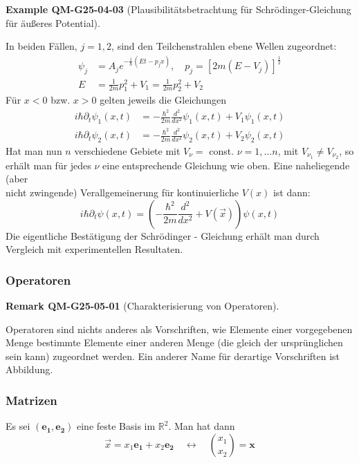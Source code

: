 \documentclass[10pt, letterpaper]{article}
\newcommand{\CustomHeading}[3]{%
  \par\medskip\noindent%
  \textbf{#1 #2} \textnormal{(#3)}.\enskip%
}
\newenvironment{REM}[2]{\begin{unitbox}\CustomHeading{Remark}{#1}{#2}}{\end{unitbox}}
\newenvironment{EXA}[2]{\begin{unitbox}\CustomHeading{Example}{#1}{#2}}{\end{unitbox}}
\begin{document}
\begin{EXA}{QM-G25-04-03}{Plausibilitätsbetrachtung für Schrödinger-Gleichung für äußeres Potential}
In beiden Fällen, $j=1,2$, sind den Teilchenstrahlen ebene Wellen zugeordnet:
$$
\begin{aligned}
\psi_{j} & =A_{j} e^{-\frac{i}{\hbar}\left(E t-p_{j} x\right)}, \quad p_{j}=\left[2 m\left(E-V_{j}\right)\right]^{\frac{1}{2}} \\
E & =\frac{1}{2 m} p_{1}^{2}+V_{1}=\frac{1}{2 m} p_{2}^{2}+V_{2}
\end{aligned}
$$
Für $x<0$ bzw. $x>0$ gelten jeweils die Gleichungen
$$
\begin{aligned}
i \hbar \partial_{t} \psi_{1}(x, t) & =-\frac{\hbar^{2}}{2 m} \frac{d^{2}}{d x^{2}} \psi_{1}(x, t)+V_{1} \psi_{1}(x, t) \\
i \hbar \partial_{t} \psi_{2}(x, t) & =-\frac{\hbar^{2}}{2 m} \frac{d^{2}}{d x^{2}} \psi_{2}(x, t)+V_{2} \psi_{2}(x, t)
\end{aligned}
$$
Hat man nun $n$ verschiedene Gebiete mit $V_{\nu}=$ const. $\nu=1, \ldots n$, mit $V_{\nu_{1}} \neq V_{\nu_{2}}$, so erhält man für jedes $\nu$ eine entsprechende Gleichung wie oben. Eine naheliegende (aber\\
nicht zwingende) Verallgemeinerung für kontinuierliche $V(x)$ ist dann:
$$
i \hbar \partial_{t} \psi(x, t)=\left(-\frac{\hbar^{2}}{2 m} \frac{d^{2}}{d x^{2}}+V(\vec{x})\right) \psi(x, t)
$$
Die eigentliche Bestätigung der Schrödinger - Gleichung erhält man durch Vergleich mit experimentellen Resultaten.
\end{EXA}





\subsubsection{Operatoren}



\begin{REM}{QM-G25-05-01}{Charakterisierung von Operatoren}
Operatoren sind nichts anderes als Vorschriften, wie Elemente einer vorgegebenen Menge bestimmte Elemente einer anderen Menge (die gleich der ursprünglichen sein kann) zugeordnet werden. Ein anderer Name für derartige Vorschriften ist Abbildung.
\end{REM}

\subsubsection*{Matrizen}


Es sei $\left(\mathbf{e}_{\mathbf{1}}, \mathbf{e}_{\mathbf{2}}\right)$ eine feste Basis im $\mathbb{R}^{2}$. Man hat dann
$$
\vec{x}=x_{1} \mathbf{e}_{\mathbf{1}}+x_{2} \mathbf{e}_{\mathbf{2}} \quad \leftrightarrow \quad\binom{x_{1}}{x_{2}}=\mathbf{x}
$$
\end{document}
